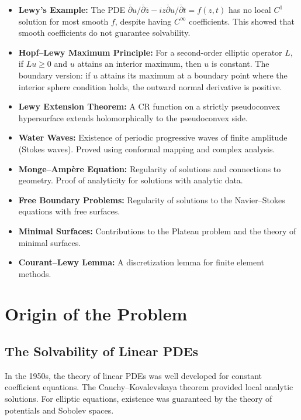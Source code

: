 \begin{itemize}
    \item \textbf{Lewy's Example:} The PDE $\overline{\partial} u / \overline{\partial} \overline{z} - i z \overline{\partial} u / \overline{\partial} t = f(z, t)$ has no local $C^1$ solution for most smooth $f$, despite having $C^\infty$ coefficients. This showed that smooth coefficients do not guarantee solvability.
    \item \textbf{Hopf--Lewy Maximum Principle:} For a second-order elliptic operator $L$, if $Lu \geq 0$ and $u$ attains an interior maximum, then $u$ is constant. The boundary version: if $u$ attains its maximum at a boundary point where the interior sphere condition holds, the outward normal derivative is positive.
    \item \textbf{Lewy Extension Theorem:} A CR function on a strictly pseudoconvex hypersurface extends holomorphically to the pseudoconvex side.
    \item \textbf{Water Waves:} Existence of periodic progressive waves of finite amplitude (Stokes waves). Proved using conformal mapping and complex analysis.
    \item \textbf{Monge--Amp\`{e}re Equation:} Regularity of solutions and connections to geometry. Proof of analyticity for solutions with analytic data.
    \item \textbf{Free Boundary Problems:} Regularity of solutions to the Navier--Stokes equations with free surfaces.
    \item \textbf{Minimal Surfaces:} Contributions to the Plateau problem and the theory of minimal surfaces.
    \item \textbf{Courant--Lewy Lemma:} A discretization lemma for finite element methods.
\end{itemize}

\section{Origin of the Problem}

\subsection{The Solvability of Linear PDEs}

In the 1950s, the theory of linear PDEs was well developed for constant coefficient equations. The Cauchy--Kovalevskaya theorem provided local analytic solutions. For elliptic equations, existence was guaranteed by the theory of potentials and Sobolev spaces.

